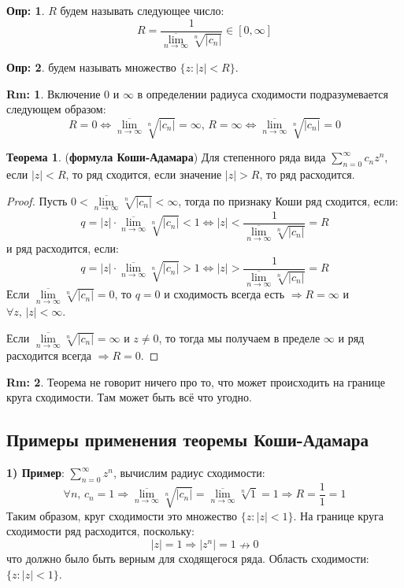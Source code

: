 \documentclass[12pt]{article}
\theoremstyle{definition}
\newtheorem{defn}{Опр:}
\newtheorem{rem}{Rm:}
\newtheorem{theorem}{Теорема}
\newcommand{\ddsum}[2]{\displaystyle\sum\limits_{#1}^{#2}}
\begin{document}
\begin{defn}
	 $R$ будем называть следующее число:
	$$
		R = \dfrac{1}{\underset{n \to \infty}{\overline{\lim}}\sqrt[n]{|c_n|} } \in [0, \infty]
	$$
\end{defn}
\begin{defn}
	 будем называть множество $\{z \colon |z| < R\}$.
\end{defn}
\begin{rem}
	Включение $0$ и $\infty$ в определении радиуса сходимости подразумевается следующем образом:
	$$
		R = 0 \Leftrightarrow \underset{n \to \infty}{\overline{\lim}}\sqrt[n]{|c_n|} = \infty, \, R = \infty \Leftrightarrow \underset{n \to \infty}{\overline{\lim}}\sqrt[n]{|c_n|} = 0
	$$
\end{rem}
\begin{theorem}(\textbf{формула Коши-Адамара})
	Для степенного ряда вида $\ddsum{n = 0}{\infty}c_n z^n$, если $|z| < R$, то ряд сходится, если значение $|z| > R$, то ряд расходится.
\end{theorem}
\begin{proof}
	Пусть $0 < \underset{n \to \infty}{\overline{\lim}}\sqrt[n]{|c_n|} < \infty$, тогда по признаку Коши ряд сходится, если:
	$$
		q = |z|{\cdot}\underset{n \to \infty}{\overline{\lim}}\sqrt[n]{|c_n|} < 1 \Leftrightarrow |z| < \dfrac{1}{\underset{n \to \infty}{\overline{\lim}}\sqrt[n]{|c_n|}} =R
	$$
	и ряд расходится, если:
	$$
		q = |z|{\cdot}\underset{n \to \infty}{\overline{\lim}}\sqrt[n]{|c_n|} > 1 \Leftrightarrow |z| > \dfrac{1}{\underset{n \to \infty}{\overline{\lim}}\sqrt[n]{|c_n|}} =R
	$$
	Если $\underset{n \to \infty}{\overline{\lim}}\sqrt[n]{|c_n|} = 0$, то $q = 0$ и сходимость всегда есть $\Rightarrow R = \infty$ и $\forall z, \, |z| < \infty$.
	
	Если $\underset{n \to \infty}{\overline{\lim}}\sqrt[n]{|c_n|} = \infty$ и $z \neq0$, то тогда мы получаем в пределе $\infty$ и ряд расходится всегда $\Rightarrow R = 0$.
\end{proof}
\begin{rem}
	Теорема не говорит ничего про то, что может происходить на границе круга сходимости. Там может быть всё что угодно.
\end{rem}
\subsection*{Примеры применения теоремы Коши-Адамара}

\textbf{1) Пример}: $\ddsum{n = 0}{\infty}z^n$, вычислим радиус сходимости: 
$$
	\forall n, \, c_n = 1 \Rightarrow \underset{n \to \infty}{\overline{\lim}}\sqrt[n]{|c_n|}  = \underset{n \to \infty}{\overline{\lim}}\sqrt[n]{1}  = 1 \Rightarrow R = \dfrac{1}{1} = 1
$$
Таким образом, круг сходимости это множество $\{z \colon |z| < 1\}$. На границе круга сходимости ряд расходится, поскольку: 
$$
	|z| = 1 \Rightarrow |z^n| = 1 \nrightarrow 0
$$
что должно было быть верным для сходящегося ряда. Область сходимости: $\{z\colon|z| < 1\}$.
\end{document}
